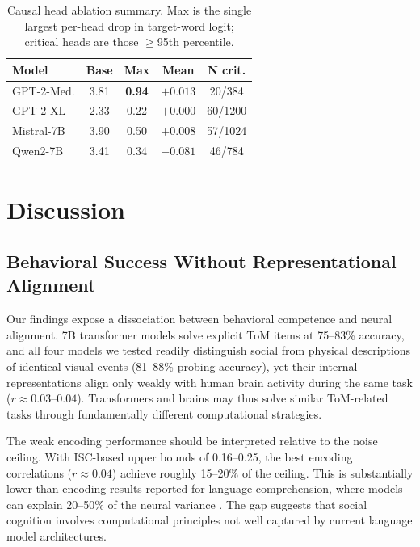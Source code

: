 \documentclass[conference]{IEEEtran}
\begin{document}
\begin{table}[t]
\centering
\caption{Causal head ablation summary. Max is the single largest per-head drop in target-word logit; critical heads are those $\geq$95th percentile.}
\label{tab:ablation}
\vskip 0.05in
\footnotesize
\setlength{\tabcolsep}{4pt}
\begin{tabular}{lcccc}
\toprule
Model & Base & Max & Mean & N crit. \\
\midrule
GPT-2-Med.  & 3.81 & \textbf{0.94} & $+0.013$ & 20/384 \\
GPT-2-XL    & 2.33 & 0.22 & $+0.000$ & 60/1200 \\
Mistral-7B  & 3.90 & 0.50 & $+0.008$ & 57/1024 \\
Qwen2-7B    & 3.41 & 0.34 & $-0.081$ & 46/784 \\
\bottomrule
\end{tabular}
\end{table}

\section{Discussion}

\subsection{Behavioral Success Without Representational Alignment}

Our findings expose a dissociation between behavioral competence and neural alignment. 7B transformer models solve explicit ToM items at 75--83\% accuracy, and all four models we tested readily distinguish social from physical descriptions of identical visual events (81--88\% probing accuracy), yet their internal representations align only weakly with human brain activity during the same task ($r \approx 0.03$--$0.04$). Transformers and brains may thus solve similar ToM-related tasks through fundamentally different computational strategies.

The weak encoding performance should be interpreted relative to the noise ceiling. With ISC-based upper bounds of 0.16--0.25, the best encoding correlations ($r \approx 0.04$) achieve roughly 15--20\% of the ceiling. This is substantially lower than encoding results reported for language comprehension, where models can explain 20--50\% of the neural variance \cite{schrimpf2021neural, caucheteux2022brains, goldstein2022shared}. The gap suggests that social cognition involves computational principles not well captured by current language model architectures.
\end{document}
